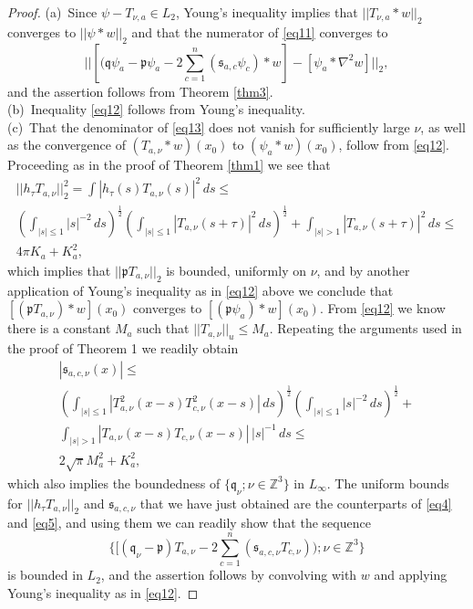 \documentclass[english, reqno]{amsart}
\newcommand{\half}{\mbox{$\frac{1}{2}$}}
\newcommand{\IZ}{\text{${\mathbb{Z}}$}}
\newcommand{\p}{\mathfrak{p}}
\newcommand{\q}{\mathfrak{q}}
\newcommand{\s}{\mathfrak{s}}
\begin{document}
\begin{proof}
(a)\ Since $\psi -  T_{\nu,a} \in L_2$, Young's inequality implies that $||T_{\nu,a} \ast w ||_2$ converges to $||\psi \ast w ||_2$ and that
the  numerator of \eqref{eq11} converges to 
\[
||[(\q\psi_{a} - \p \psi_{a} -2\sum_{c=1}^n (\s_{a,c}\psi_{c})\ast w ] -[\psi_{a}\ast \nabla^2w]||_2,
\]
and the assertion follows from Theorem \ref{thm3}.\\
(b)\ Inequality \eqref{eq12} follows from Young's inequality.\\
(c)\ That the denominator of \eqref{eq13} does not vanish for sufficiently large $\nu$, as well as the convergence of $(T_{a, \nu} \ast w)(x_0)$ to
$(\psi_a \ast w)(x_0)$, follow from \eqref{eq12}. 
Proceeding as in the proof of Theorem \ref{thm1} we see that
\begin{multline*}
||h_{\tau}T_{a,\nu} ||^2_2=\int |h_{\tau}(s)T_{a,\nu}(s)|^2 \,ds \le\\
\left (\int _{|s|\le1}|s|^{-2}\,ds \right)^{\half} \left (\int _{|s|\le1}|T_{a,\nu}(s+\tau)|^2 \,ds \right )^{\half} +\int_{|s| >1}|T_{a,\nu}(s+\tau)|^2 \,ds \le\\
4\pi K_a+K^2_a,
\end{multline*}
which implies that $||\p T_{a,\nu}||_2$ is bounded, uniformly on $\nu$, and by another application of Young's inequality
as in \eqref{eq12} above we conclude that $[(\p T_{a,\nu})\ast w](x_0)$ converges to $[(\p\psi_a)\ast w](x_0)$.
From \eqref{eq12} we know there is a constant $M_a$ such that $||T_{a,\nu}||_u \le M_a$. Repeating the arguments used in the proof of Theorem 1 we readily obtain
\begin{multline*}
|\s_{a,c,\nu}(x)| \le\\
 \left ( \int_{|s|\le 1}|T^2_{a,\nu}(x-s) T^2_{c,\nu}(x-s)|\,ds \right )^{\half} \left (\int_{|s|\le1}|s|^{-2}\, ds \right)^{\half} +\\
\int_{|s| > 1}|T_{a,\nu}(x-s) T_{c,\nu}(x-s)| \,|s|^{-1}\,ds\le\\
2 \sqrt{\pi} M_a^2+K^2_a,
\end{multline*}
which also implies the boundedness of $\{\q_{\nu}; \nu \in \IZ^3\}$ in $L_{\infty}$. The uniform bounds for 
$||h_{\tau}T_{a,\nu }||_2$ and $\s_{a,c,\nu}$ that we have just obtained are the counterparts of \eqref{eq4} and \eqref{eq5}, and using them we can readily show that the sequence 
\[
\{[( \q_{\nu}-\p )T_{a,\nu} -2\sum_{c=1}^n(\s_{a,c,\nu} T_{c,\nu}) ); \nu \in \IZ^3\}
\]
is bounded in $L_2$, and the assertion follows by convolving with $w$ and applying Young's inequality as in \eqref{eq12}.
\end{proof}
\end{document}

